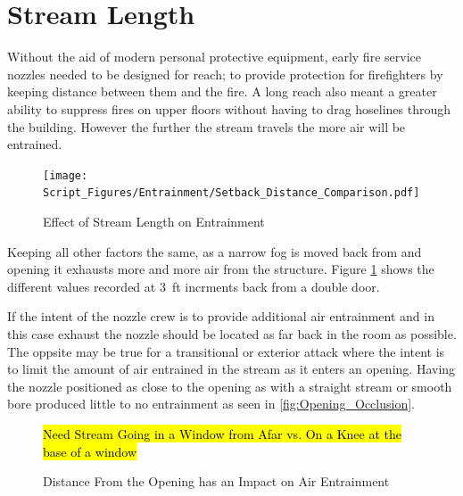 \documentclass[12pt,oneside]{book}
\begin{document}


\section{Stream Length}
Without the aid of modern personal protective equipment, early fire service nozzles needed to be designed for reach; to provide protection for firefighters by keeping distance between them and the fire. A long reach also meant a greater ability to suppress fires on upper floors without having to drag hoselines through the building. However the further the stream travels the more air will be entrained. 

\begin{figure}
\centering
\texttt{[image: Script\_Figures/Entrainment/Setback\_Distance\_Comparison.pdf]}
\caption{Effect of Stream Length on Entrainment}
\label{fig:Setback}
\end{figure}

Keeping all other factors the same, as a narrow fog is moved back from and opening it exhausts more and more air from the structure. Figure \ref{fig:Setback} shows the different values recorded at 3~ft incrments back from a double door. 


If the intent of the nozzle crew is to provide additional air entrainment and in this case exhaust the nozzle should be located as far back in the room as possible. The oppsite may be true for a transitional or exterior attack where the intent is to limit the amount of air entrained in the stream as it enters an opening. Having the nozzle positioned as close to the opening as with a straight stream or smooth bore produced little to no entrainment as seen in \ref{fig:Opening_Occlusion}.

\begin{figure}
\centering
\hl{Need Stream Going in a Window from Afar vs. On a Knee at the base of a window}
\caption{Distance From the Opening has an Impact on Air Entrainment}
\label{fig:ExteriorDist}
\end{figure}
\end{document}

